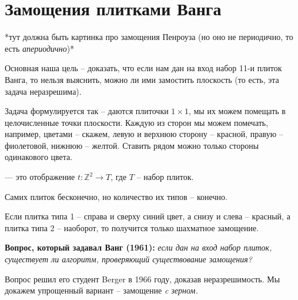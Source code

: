 \section{Замощения плитками Ванга}

*тут должна быть картинка про замощения Пенроуза (но оно не периодично, то есть \textit{апериодично})*

Основная наша цель -- доказать, что если нам дан на вход набор 11-и плиток Ванга, то
нельзя выяснить, можно ли ими замостить плоскость (то есть, эта задача неразрешима).

Задача формулируется так -- даются плиточки $ 1 \times 1 $, мы их можем помещать в целочисленные точки плоскости. Каждую из сторон мы можем помечать, например, цветами -- скажем, левую и верхнюю сторону -- красной, правую -- фиолетовой, нижнюю -- желтой. Ставить рядом можно только стороны одинакового цвета.

\begin{defn}[Замощение]
     --- это отображение $ t\colon  \mathbb{Z}^2 \to T $, где $ T $ -- набор плиток.
\end{defn}

\begin{note}
    Самих плиток бесконечно, но количество их типов -- конечно.
\end{note}

\begin{ex}
    Если плитка типа 1 -- справа и сверху синий цвет, а снизу и слева -- красный, а плитка типа 2 -- наоборот, то получится только шахматное замощение.
\end{ex}

\noindent \textbf{Вопрос, который задавал Ванг (1961):} \textit{если дан на вход набор плиток, существует ли алгоритм, проверяющий существование замощения?}

Вопрос решил его студент Berger в 1966 году, доказав неразрешимость.
Мы докажем упрощенный вариант -- замощение \textit{c зерном.}

